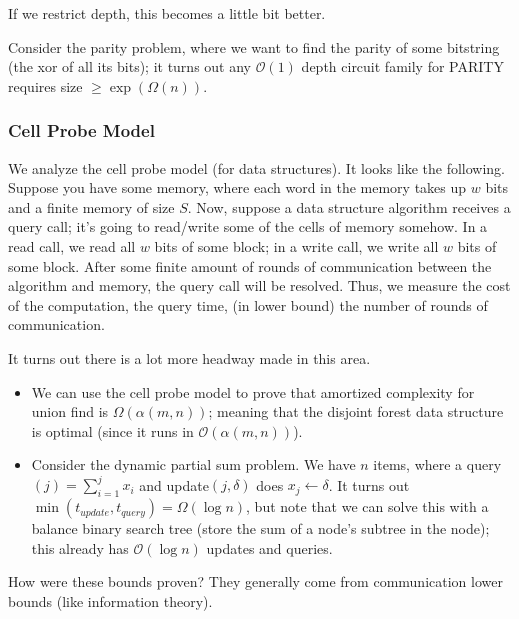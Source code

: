 If we restrict depth, this becomes a little bit better.

\begin{example}
    Consider the parity problem, where we want to find the parity of some bitstring (the xor of all its bits); it turns out any $\mathcal{O}(1)$ depth
    circuit family for PARITY requires size $\geq \exp(\Omega(n))$.
\end{example}

\subsubsection{Cell Probe Model}

We analyze the cell probe model (for data structures). It looks like the following. Suppose you have some memory,
where each word in the memory takes up $w$ bits and a finite memory of size $S$. Now, suppose a data structure algorithm receives a query call;
it's going to read/write some of the cells of memory somehow. In a read call, we read all $w$ bits of some block; in a write call, we write all $w$ bits of some block.
After some finite amount of rounds of communication between the algorithm and memory, the query call will be resolved. Thus, we measure the cost of the computation, the query time,
(in lower bound) the number of rounds of communication.

It turns out there is a lot more headway made in this area.

\begin{example}
    \begin{itemize}
        \item We can use the cell probe model to prove that amortized complexity for union find is $\Omega(\alpha(m,n))$; meaning that the disjoint forest data structure is optimal (since it runs in $\mathcal{O}(\alpha(m,n))$).
        \item Consider the dynamic partial sum problem. We have $n$ items, where a query$(j) = \sum_{i = 1}^{j} x_i$ and update$(j, \delta)$ does $x_j \gets \delta$. It turns out $\min(t_{update}, t_{query}) = \Omega(\log n)$,
        but note that we can solve this with a balance binary search tree (store the sum of a node's subtree in the node); this already has $\mathcal{O}(\log n)$ updates and queries.
    \end{itemize}
\end{example}

How were these bounds proven? They generally come from communication lower bounds (like information theory).

